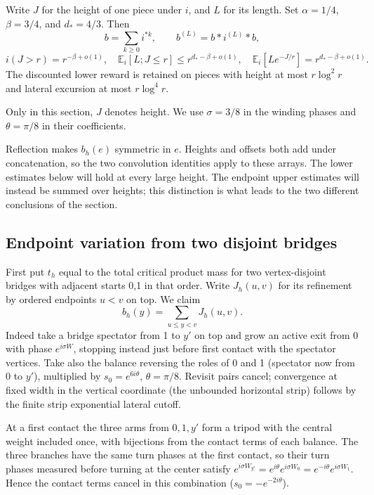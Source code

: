 \begin{proposition}\label{c:pv-rewards}
Write $J$ for the height of one piece under $i$, and $L$ for its length.
Set $\alpha=1/4$, $\beta=3/4$, and $d_*=4/3$. Then
\[
 b=\sum_{k\ge0}i^{*k},\qquad b^{(L)}=b*i^{(L)}*b,
\]
\[
 i(J>r)=r^{-\beta+o(1)},\quad
 \mathbb E_i[L;J\le r]\le r^{d_*-\beta+o(1)},\quad
 \mathbb E_i[Le^{-J/r}]=r^{d_*-\beta+o(1)}.
\]
The discounted lower reward is retained on pieces with height at most
$r\log^2r$ and lateral excursion at most $r\log^4r$.
\end{proposition}
Only in this section, $J$ denotes height. We use $\sigma=3/8$ in the winding phases and
$\theta=\pi/8$ in their coefficients.

Reflection makes $b_h(e)$ symmetric in $e$. Heights and offsets both add under concatenation, so the two convolution identities apply to these arrays.
The lower estimates below will hold at every large height. The endpoint
upper estimates will instead be summed over heights; this distinction is
what leads to the two different conclusions of the section.

\subsection{Endpoint variation from two disjoint bridges}
First put \(t_h\) equal to the total critical product mass for two vertex-disjoint bridges with adjacent starts 0,1 in that order. Write \(J_h(u,v)\) for its refinement by ordered endpoints \(u<v\) on top. We claim
\[
 b_h(y)=\sum_{u\le y<v}J_h(u,v).
\]
Indeed take a bridge spectator from 1 to \(y'\) on top and grow an active exit from 0 with phase \(e^{i\sigma W}\), stopping instead just before first contact with the spectator vertices. Take also the balance reversing the roles of 0 and 1 (spectator now from 0 to \(y'\)), multiplied by \(s_0=e^{6i\theta}\), \(\theta=\pi/8\). Revisit pairs cancel; convergence at fixed width in the vertical coordinate (the unbounded horizontal strip) follows by the finite strip exponential lateral cutoff.

At a first contact the three arms from \(0,1,y'\) form a tripod with the central weight included once, with bijections from the contact terms of each balance. The three branches have the same turn phases at the first contact, so their turn phases measured before turning at the center satisfy
\(e^{i\sigma W_{y'}}=e^{i\theta}e^{i\sigma W_0}=e^{-i\theta}e^{i\sigma W_1}\).
Hence the contact terms cancel in this combination (\(s_0=-e^{-2i\theta}\)).

